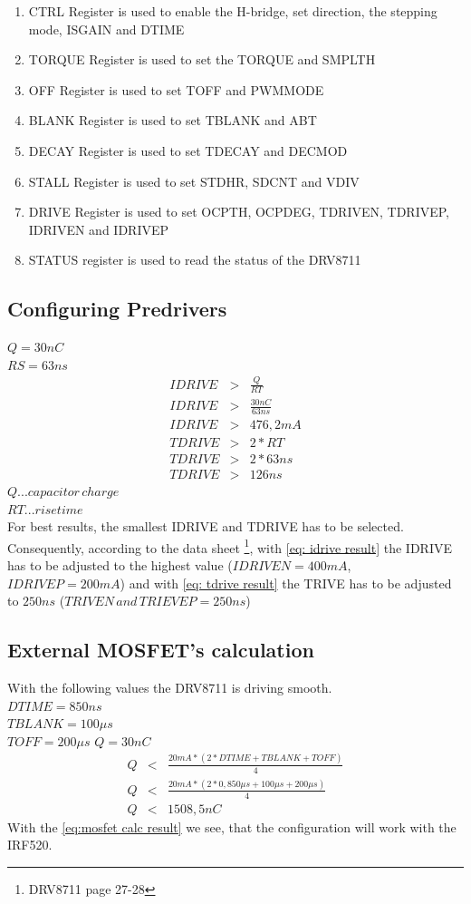 \documentclass[a4paper,12pt]{scrreprt}
\begin{document}
\begin{enumerate}
\item [0] CTRL Register is used to enable the H-bridge, set direction, the stepping mode, ISGAIN and DTIME
\item [1] TORQUE Register is used to set the TORQUE and SMPLTH
\item [2] OFF Register is used to set TOFF and PWMMODE
\item [3] BLANK Register is used to set TBLANK and ABT
\item [4] DECAY Register is used to set TDECAY and DECMOD
\item [5] STALL Register is used to set STDHR, SDCNT and VDIV
\item [6] DRIVE Register is used to set OCPTH, OCPDEG, TDRIVEN, TDRIVEP, IDRIVEN and IDRIVEP
\item [7] STATUS register is used to read the status of the DRV8711
\end{enumerate}

\subsection{Configuring Predrivers}
$Q=30nC$\\
$RS=63ns$
\begin{eqnarray}
IDRIVE &>& \frac{Q}{RT} \label{eq: idrive}\\
IDRIVE &>& \frac{30nC}{63ns}\\
IDRIVE &>&  476,2 mA \label{eq: idrive result}\\
TDRIVE &>& 2 * RT \label{eq: tdrive}\\
TDRIVE &>& 2 * 63ns\\
TDRIVE &>& 126ns \label{eq: tdrive result}
\end{eqnarray}
$Q...capacitor \, charge$\\
$RT...rise time$\\
For best results, the smallest IDRIVE and TDRIVE has to be selected. Consequently, according to the data sheet \footnote{DRV8711 page 27-28}, with \autoref{eq: idrive result} the IDRIVE has to be adjusted to the highest value ($IDRIVEN=400mA$, $IDRIVEP=200mA$) and with \autoref{eq: tdrive result} the TRIVE has to be adjusted to $250ns$ ($TRIVEN \, and \, TRIEVEP=250ns$)

\subsection{External \acs{MOSFET}'s calculation}
With the following values the DRV8711 is driving smooth.\\
$DTIME=850 ns$\\
$TBLANK=100 \mu s$\\
$TOFF=200 \mu s$
$Q=30nC$
\begin{eqnarray}
Q&<&\frac{20mA*(2*DTIME+TBLANK+TOFF)}{4}\label{eq:mosfet calc}\\
Q&<&\frac{20mA*(2*0,850\mu s+100\mu s+200\mu s)}{4}\\
Q&<&1508,5nC\label{eq:mosfet calc result}
\end{eqnarray}
With the \autoref{eq:mosfet calc result} we see, that the configuration will work with the IRF520.
\end{document}

